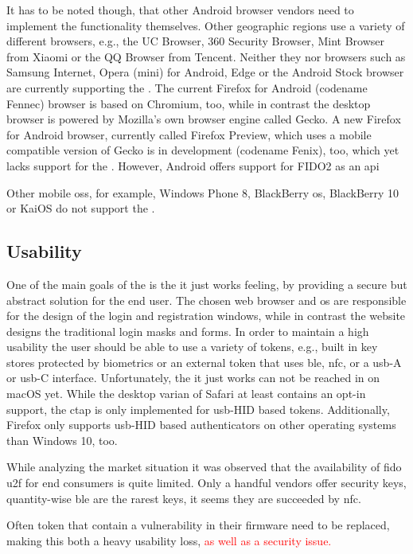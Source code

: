It has to be noted though, that other Android browser vendors need to implement the functionality themselves. Other geographic regions use a variety of different browsers, e.g., the UC Browser, 360 Security Browser, Mint Browser from Xiaomi or the QQ Browser from Tencent. Neither they nor browsers such as Samsung Internet, Opera (mini) for Android, Edge or the Android Stock browser are currently supporting the \wa. The current Firefox for Android (codename \frqq Fennec\flqq) browser is based on Chromium, too, while in contrast the desktop browser is powered by Mozilla's own browser engine called \frqq Gecko\flqq. A new Firefox for Android browser, currently called Firefox Preview, which uses a mobile compatible version of Gecko is in development (codename \frqq Fenix\flqq), too, which yet lacks support for the \wa. However, Android offers support for FIDO2 as an \gls{api}

Other mobile \glspl{os}, for example, Windows Phone 8, BlackBerry \gls{os}, BlackBerry 10 or KaiOS do not support the \wa.

\subsection{Usability}

One of the main goals of the \wa{} is the \frqq it just works\flqq{} feeling, by providing a secure but abstract solution for the end user. The chosen web browser and \gls{os} are responsible for the design of the login and registration windows, while in contrast the website designs the traditional login masks and forms. In order to maintain a high usability the user should be able to use a variety of tokens, e.g., built in key stores protected by biometrics or an external token that uses \gls{ble}, \gls{nfc}, or a \gls{usb}-A or \gls{usb}-C interface. Unfortunately, the \frqq it just works\flq{} can not be reached in on macOS yet. While the desktop varian of Safari at least contains an opt-in support, the \gls{ctap} is only implemented for \gls{usb}-HID based tokens. Additionally, Firefox only supports \gls{usb}-HID based authenticators on other operating systems than Windows 10, too.

While analyzing the market situation it was observed that the availability of \gls{fido} \gls{u2f} for end consumers is quite limited. Only a handful vendors offer security keys, quantity-wise \gls{ble} are the rarest keys, it seems they are succeeded by \gls{nfc}.

Often token that contain a vulnerability in their firmware need to be replaced, making this both a heavy usability loss, \textcolor{red}{as well as a security issue.}


